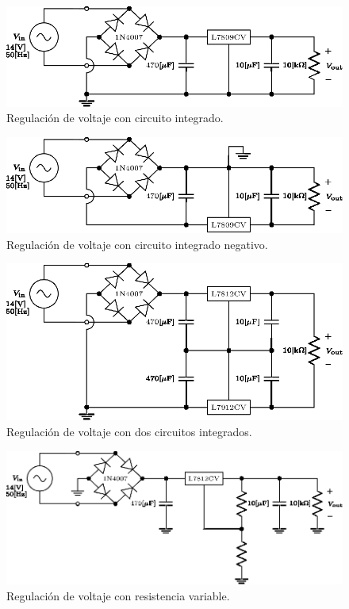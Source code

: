 \documentclass[letter,twoside,11pt]{article}
\begin{document}
\begin{figure}[!h]
\centering
\includegraphics[scale=1.50]{09.regulador2.eps}
\caption{Regulación de voltaje con circuito integrado.}
\label{circuito9}
\end{figure}

\begin{figure}[!h]
\centering
\includegraphics[scale=1.50]{10.regulador3.eps}
\caption{Regulación de voltaje con circuito integrado negativo.}
\label{circuito9}
\end{figure}

\begin{figure}[!h]
\centering
\includegraphics[scale=1.50]{11.regulador4.eps}
\caption{Regulación de voltaje con dos circuitos integrados.}
\label{circuito9}
\end{figure}

\begin{figure}[!h]
\centering
\includegraphics[scale=1.50]{12.regulador5.eps}
\caption{Regulación de voltaje con resistencia variable.}
\label{circuito9}
\end{figure}
\end{document}
